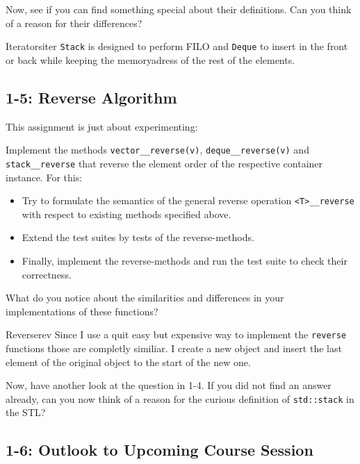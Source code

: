 \documentclass[]{article}
\providecommand{\tightlist}{%
  \setlength{\itemsep}{0pt}\setlength{\parskip}{0pt}}
\begin{document}
Now, see if you can find something special about their definitions. Can
you think of a reason for their differences?
  \begin{example}{Iterators}{iter}
        \texttt{Stack} is designed to perform FILO and \texttt{Deque} to insert
        in the front or back while keeping the memoryadress of the rest of the
        elements.
  \end{example}

\subsection{1-5: Reverse Algorithm}\label{reverse-algorithm}

This assignment is just about experimenting:

Implement the methods \texttt{vector\_\_reverse(v)},
\texttt{deque\_\_reverse(v)} and \texttt{stack\_\_reverse} that reverse
the element order of the respective container instance. For this:

\begin{itemize}
\tightlist
\item
  Try to formulate the semantics of the general reverse operation
  \texttt{\textless{}T\textgreater{}\_\_reverse} with respect to
  existing methods specified above.
\item
  Extend the test suites by tests of the reverse-methods.
\item
  Finally, implement the reverse-methods and run the test suite to check
  their correctness.
\end{itemize}

What do you notice about the similarities and differences in your
implementations of these functions?
  \begin{example}{Reverse}{rev}
    Since I use a quit easy but expensive way to implement the \texttt{reverse} functions those are completly similiar. I create a new object and insert the last element of the original object to the start of the new one.
  \end{example}

Now, have another look at the question in 1-4. If you did not find an
answer already, can you now think of a reason for the curious definition
of \texttt{std::stack} in the STL?

\subsection{1-6: Outlook to Upcoming Course
Session}\label{outlook-to-upcoming-course-session}
\end{document}
